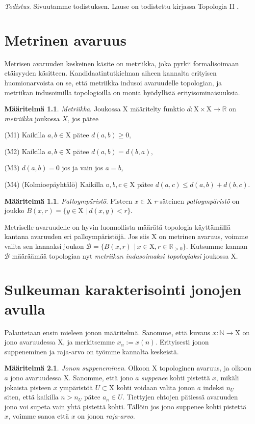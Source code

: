\documentclass[12pt,a4paper,leqno]{report}
\newcommand{\R}{\mathbb{R}}
\newcommand{\N}{\mathbb{N}}
\newcommand{\X}{\mathrm{X}}
\newcommand{\B}{\mathcal{B}}
\theoremstyle{plain}
\theoremstyle{definition}
\newtheorem{maar}[equation]{Määritelmä}
\theoremstyle{remark}
\begin{document}
\noindent\emph{Todistus}. Sivuutamme todistuksen. Lause on todistettu kirjassa Topologia II \cite{Topo}.

\chapter{Metrinen avaruus}\label{MET}

Metrisen avaruuden keskeinen käsite on metriikka, joka pyrkii formalisoimaan etäisyyden käsitteen. Kandidaatintutkielman aiheen kannalta erityisen huomionarvoista on se, että metriikka indusoi avaruudelle topologian, ja metriikan indusoimilla topologioilla on monia hyödyllisiä erityisominaisuuksia.

\begin{maar}\label{metmaar}
\emph{Metriikka}. Joukossa $\X$ määritelty funktio $d : \X \times \X \to \R$ on \emph{metriikka} joukossa $X$, jos pätee

(M1) Kaikilla $a, b \in \X$ pätee $d(a,b) \geq 0$,

(M2) Kaikilla $a, b \in \X$ pätee $d(a,b) = d(b,a)$,

(M3) $d(a,b) = 0$ jos ja vain jos $a = b$,

(M4) (Kolmioepäyhtälö) Kaikilla $a, b, c \in \X$ pätee $d(a,c) \leq d(a,b) + d(b,c)$.
\end{maar}

\begin{maar}\label{pallomar}
\emph{Palloympäristö}. Pisteen $x \in \X$ $r$-säteinen \emph{palloympäristö} on joukko $B(x,r) = \{ y \in \X \mid d(x, y) < r \}$.
\end{maar}

Metriselle avaruudelle on hyvin luonnollista määrätä topologia käyttämällä kantana avaruuden eri palloympäristöjä. Jos siis $\X$ on metrinen avaruus, voimme valita sen kannaksi joukon $\B = \{ B(x,r) \mid x \in \X, r \in \R_{> 0} \}$. Kutsumme kannan $\B$ määräämää topologiaa nyt \emph{metriikan indusoimaksi topologiaksi} joukossa $\X$.

\chapter{Sulkeuman karakterisointi jonojen avulla}

Palautetaan ensin mieleen jonon määritelmä. Sanomme, että kuvaus $x : \N \to \X$ on jono avaruudessa $\X$, ja merkitsemme $x_n := x(n)$. Erityisesti jonon suppeneminen ja raja-arvo on työmme kannalta keskeistä.

\begin{maar}\label{jonosupmaar}
\emph{Jonon suppeneminen}. Olkoon $\X$ topologinen avaruus, ja olkoon $a$ jono avaruudessa $\X$. Sanomme, että jono $a$ \emph{suppenee} kohti pistettä $x$, mikäli jokaista pisteen $x$ ympäristöä $U \subset \X$ kohti voidaan valita jonon $a$ indeksi $n_U$ siten, että kaikilla $n > n_U$ pätee $a_n \in U$. Tiettyjen ehtojen pätiessä avaruuden jono voi supeta vain yhtä pistettä kohti. Tällöin jos jono suppenee kohti pistettä $x$, voimme sanoa että $x$ on jonon \emph{raja-arvo}.
\end{maar}
\end{document}
